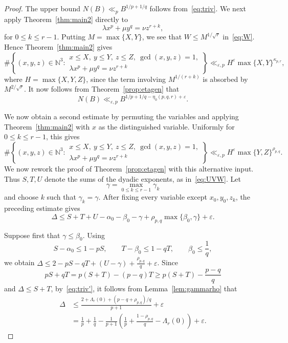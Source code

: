 \documentclass[a4paper,11pt,twoside,reqno]{amsart}
\theoremstyle{definition}
\theoremstyle{remark}
\numberwithin{equation}{section}
\newcommand\ve{\varepsilon}
\newcommand\1{\mathbf{1}}
\renewcommand{\leq}{\leqslant}
\renewcommand{\le}{\leqslant}
\renewcommand{\geq}{\geqslant}
\begin{document}
\begin{proof}
The upper bound 
$N(B)
 \ll_{p}
 B^{1/p+1/q}$ follows from~\eqref{eq:triv}.
We next apply Theorem~\ref{thm:main2} directly to
\[
\lambda x^p+\mu y^q=\nu z^{r+k},
\]
for $0\leq k\leq r-1$. Putting $M=\max\{X,Y\}$, we see that
$W\leq M^{1/\sqrt r}$ in~\eqref{eq:W}. Hence Theorem~\ref{thm:main2}
gives
\[
\#\left\{(x,y,z)\in \mathbb N^3:
\begin{array}{l}
x\le X,\ y\le Y,\ z\le Z,\ \gcd(x,y,z)=1,\\
\lambda x^p+\mu y^q=\nu z^{r+k}
\end{array}
\right\}
\ll_{\varepsilon,p}
H^{\ve}\max\{X,Y\}^{\kappa_{p,r}},
\]
where $H=\max\{X,Y,Z\}$,
since the term involving
$M^{1/(r+k)}$ is absorbed by $M^{2/\sqrt r}$.
It now follows from Theorem~\ref{prop:etagen} that 
\[
N(B)
 \ll_{\varepsilon,p}
 B^{1/p+1/q-\eta_0(p,q,r)+\varepsilon}.
\]

We now obtain a second estimate by permuting the variables and
applying Theorem~\ref{thm:main2} with $x$ as the distinguished
variable. Uniformly for $0\leq k\leq r-1$, this gives
\[
\#\left\{(x,y,z)\in \mathbb N^3:
\begin{array}{l}
x\le X,\ y\le Y,\ z\le Z,\ \gcd(x,y,z)=1,\\
\lambda x^p+\mu y^q=\nu z^{r+k}
\end{array}
\right\}
\ll_{\varepsilon,p}
H^{\ve}\max\{Y,Z\}^{\rho_{p,q}}.
\]
We now rework the proof of 
Theorem~\ref{prop:etagen} with this alternative input. Thus $S,T,U$ denote the
sums of the dyadic exponents, as in~\eqref{eq:UVW}. 
Let
\[
\gamma=\max_{0\leq k\leq r-1}\gamma_k
\]
and choose $k$ such that $\gamma_k=\gamma$. After fixing every
variable except $x_0,y_0,z_k$, the preceding estimate gives
\[
\Delta
 \leq
 S+T+U-\alpha_0-\beta_0-\gamma
 +\rho_{p,q}\max\{\beta_0,\gamma\}
 +\varepsilon.
\]

Suppose first that $\gamma\leq\beta_0$. Using
\[
S-\alpha_0\leq1-pS,\qquad
T-\beta_0\leq1-qT,\qquad
\beta_0\leq\frac1q,
\]
we obtain
$\Delta
 \leq
 2-pS-qT+(U-\gamma)+\frac{\rho_{p,q}}q+\varepsilon$.
Since
\[
pS+qT
 =
 p(S+T)-(p-q)T
 \geq
 p(S+T)-\frac{p-q}{q}
\]
and $\Delta\leq S+T$, by~\eqref{eq:triv'}, 
it follows from Lemma~\ref{lem:gammarho}
that
\begin{align*}
\Delta
 &\leq
 \frac{
 2+\Lambda_r(0)+(p-q+\rho_{p,q})/q
 }{p+1}
 +\varepsilon\\
 &=
\frac1p+\frac1q
 -
 \frac1{p+1}
 \left(
 \frac1p+\frac{1-\rho_{p,q}}q-\Lambda_r(0)
 \right)
 +\varepsilon.
\end{align*}


\end{proof}
\end{document}

